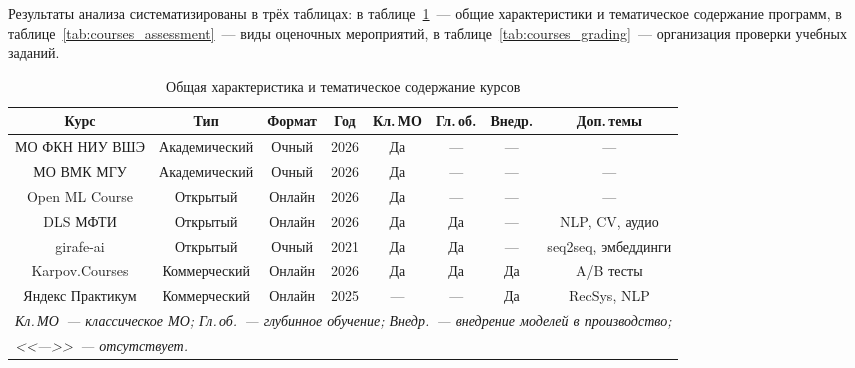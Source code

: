 Результаты анализа систематизированы в трёх таблицах:
в таблице~\ref{tab:courses_general}~--- общие характеристики
и тематическое содержание программ,
в таблице~\ref{tab:courses_assessment}~--- виды оценочных мероприятий,
в таблице~\ref{tab:courses_grading}~--- организация проверки учебных заданий.

\begin{table}[h!]
\caption{Общая характеристика и тематическое содержание курсов}
\label{tab:courses_general}
\centering
\footnotesize
\setlength{\tabcolsep}{3pt}
\begin{tabular}{|c|c|c|c|c|c|c|c|}
\hline
\textbf{Курс} &
\textbf{Тип} &
\textbf{Формат} &
\textbf{Год} &
\textbf{Кл.\,МО} &
\textbf{Гл.\,об.} &
\textbf{Внедр.} &
\textbf{Доп.\,темы} \\
\hline
МО ФКН НИУ ВШЭ   & Академический & Очный  & 2026 & Да   & ---  & ---  & --- \\
\hline
МО ВМК МГУ       & Академический & Очный  & 2026 & Да   & ---  & ---  & --- \\
\hline
Open ML Course   & Открытый      & Онлайн & 2026 & Да   & ---  & ---  & --- \\
\hline
DLS МФТИ         & Открытый      & Онлайн & 2026 & Да   & Да   & ---  & NLP, CV, аудио \\
\hline
girafe-ai        & Открытый      & Очный  & 2021 & Да   & Да   & ---  & seq2seq, эмбеддинги \\
\hline
Karpov.Courses   & Коммерческий  & Онлайн & 2026 & Да   & Да   & Да   & A/B тесты \\
\hline
Яндекс Практикум & Коммерческий  & Онлайн & 2025 & ---  & ---  & Да   & RecSys, NLP \\
\hline
\multicolumn{8}{|l|}{\textit{Кл.\,МО~--- классическое МО; Гл.\,об.~--- глубинное обучение; Внедр.~--- внедрение моделей в производство;}} \\
\multicolumn{8}{|l|}{\textit{<<--->>~--- отсутствует.}} \\
\hline
\end{tabular}
\end{table}


